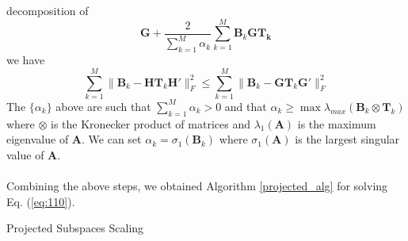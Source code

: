 decomposition of
\begin{equation}
  \label{eq:113}
  \mathbf{G} + \frac{2}{\sum_{k=1}^{M} \alpha_k} \sum_{k=1}^{M}
  \mathbf{B}_k \mathbf{G} \mathbf{T_k}
\end{equation}
we have
\begin{equation}
  \label{eq:114}
  \sum_{k=1}^{M} \| \mathbf{B}_k - \mathbf{H}
\mathbf{T}_k \mathbf{H}' \|_F^2 \leq \sum_{k=1}^{M} \|
\mathbf{B}_k - \mathbf{G}
\mathbf{T}_k \mathbf{G}' \|_F^2 
\end{equation}
The $\{\alpha_k\}$ above are such that $\sum_{k=1}^{M}{\alpha_k} > 0$
and that $\alpha_k \geq \max{
  \lambda_{max}(\mathbf{B}_k \otimes \mathbf{T}_k)
}$ where $\otimes$ is the Kronecker product of matrices and
$\lambda_{1}(\mathbf{A})$ is the maximum eigenvalue of
$\mathbf{A}$. We can set $\alpha_k = \sigma_1(\mathbf{B}_k)$
where $\sigma_1(\mathbf{A})$ is the largest singular value of
$\mathbf{A}$. \\ \\
\noindent
Combining the above steps, we obtained Algorithm \ref{projected_alg} for
solving Eq. (\ref{eq:110}). 
\begin{algorithm}
  \dontprintsemicolon
   \caption{Projected Subspaces Scaling}
   \label{projected_alg}
 \end{algorithm}

